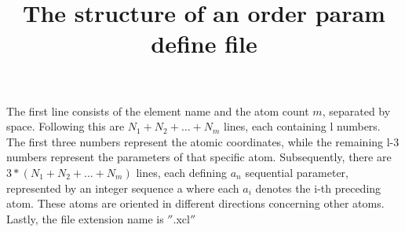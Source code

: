 \usepackage[english]{babel}
\usepackage[letterpaper,top=2cm,bottom=2cm,left=3cm,right=3cm,marginparwidth=1.75cm]{geometry}
\usepackage{amsmath}

\title{The structure of an order param define file}

\maketitle
The first line consists of the element name and the atom count $m$, separated by space.
Following this are $ N_1 + N_2 + \dots + N_m $ lines, each containing l numbers.
The first three numbers represent the atomic coordinates, while the remaining l-3 numbers represent the parameters of that specific atom.
Subsequently, there are $ 3*(N_1 + N_2 + \dots + N_m) $ lines, each defining $a_n$ sequential parameter, represented by an integer sequence a where each $ a_i $ denotes the i-th preceding atom.
These atoms are oriented in different directions concerning other atoms.
Lastly, the file extension name is \(''\).xcl\(''\)
